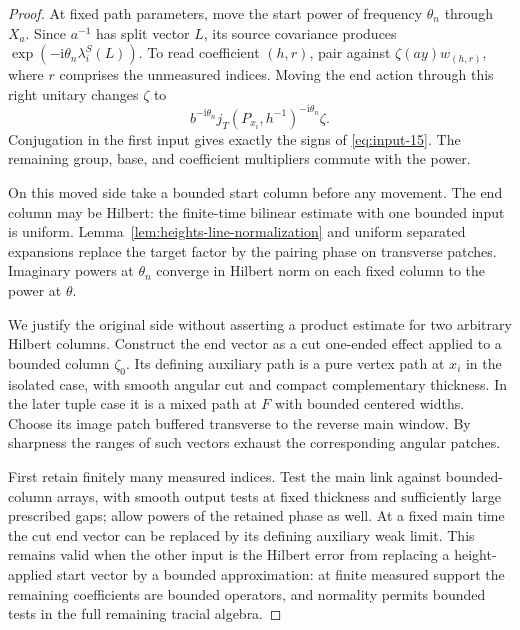 \begin{proof}
At fixed path parameters, move the start power of frequency $\theta_n$
through $X_a$.  Since $a^{-1}$ has split vector $L$, its source covariance
produces $\exp(-\mathrm i\theta_n\lambda_i^S(L))$.  To read coefficient
$(h,r)$, pair against $\zeta(ay)w_{(h,r)}$, where $r$ comprises the
unmeasured indices.  Moving the end action through this right unitary
changes $\zeta$ to
\[
 b^{-\mathrm i\theta_n}
 j_T(P_{x_i},h^{-1})^{-\mathrm i\theta_n}\zeta.
\]
Conjugation in the first input gives exactly the signs of
\eqref{eq:input-15}.  The remaining group, base, and coefficient multipliers
commute with the power.

On this moved side take a bounded start column before any movement.  The
end column may be Hilbert: the finite-time bilinear estimate with one
bounded input is uniform.  Lemma~\ref{lem:heights-line-normalization} and
uniform separated expansions replace the target factor by the pairing
phase on transverse patches.  Imaginary powers at $\theta_n$ converge in
Hilbert norm on each fixed column to the power at $\theta$.

We justify the original side without asserting a product estimate for two
arbitrary Hilbert columns.  Construct the end vector as a cut one-ended
effect applied to a bounded column $\zeta_0$.  Its defining auxiliary path
is a pure vertex path at $x_i$ in the isolated case, with smooth angular
cut and compact complementary thickness.  In the later tuple case it is a
mixed path at $F$ with bounded centered widths.  Choose its image patch
buffered transverse to the reverse main window.  By sharpness the ranges
of such vectors exhaust the corresponding angular patches.

First retain finitely many measured indices.  Test the main link against
bounded-column arrays, with smooth output tests at fixed thickness and
sufficiently large prescribed gaps; allow powers of the retained phase as
well.  At a fixed main time the cut end vector can be replaced by its
defining auxiliary weak limit.  This remains valid when the other input is
the Hilbert error from replacing a height-applied start vector by a bounded
approximation: at finite measured support the remaining coefficients are
bounded operators, and normality permits bounded tests in the full
remaining tracial algebra.


\end{proof}
